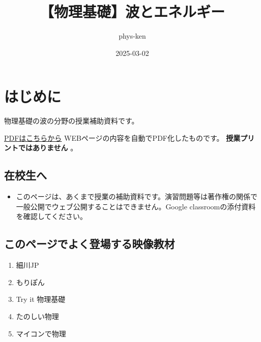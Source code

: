\documentclass[
  letterpaper,
]{bxjsbook}
\title{【物理基礎】波とエネルギー}
\author{phys-ken}
\date{2025-03-02}
\providecommand{\tightlist}{%
  \setlength{\itemsep}{0pt}\setlength{\parskip}{0pt}}\usepackage{longtable,booktabs,array}
\renewcommand*\contentsname{Table of contents}
\newcommand\contentsname{Table of contents}
\begin{document}
\maketitle

\renewcommand*\contentsname{Table of contents}
{
\hypersetup{linkcolor=}
\setcounter{tocdepth}{2}
\tableofcontents
}


\chapter*{はじめに}\label{ux306fux3058ux3081ux306b}


物理基礎の波の分野の授業補助資料です。

\href{https://phys-ken.github.io/demo_wave_2025/\%E3\%80\%90\%E7\%89\%A9\%E7\%90\%86\%E5\%9F\%BA\%E7\%A4\%8E\%E3\%80\%91\%E6\%B3\%A2\%E3\%81\%A8\%E3\%82\%A8\%E3\%83\%8D\%E3\%83\%AB\%E3\%82\%AE\%E3\%83\%BC.pdf}{PDFはこちらから}
WEBページの内容を自動でPDF化したものです。
\textbf{授業プリントではありません} 。

\section*{在校生へ}\label{ux5728ux6821ux751fux3078}


\begin{itemize}
\tightlist
\item
  このページは、あくまで授業の補助資料です。演習問題等は著作権の関係で一般公開でウェブ公開することはできません。Google
  classroomの添付資料を確認してください。
\end{itemize}

\section*{このページでよく登場する映像教材}\label{ux3053ux306eux30daux30fcux30b8ux3067ux3088ux304fux767bux5834ux3059ux308bux6620ux50cfux6559ux6750}


\begin{enumerate}
\def\labelenumi{\arabic{enumi}.}
\tightlist
\item
  細川JP
\item
  もりぽん
\item
  Try it 物理基礎
\item
  たのしい物理
\item
  マイコンで物理
\end{enumerate}
\end{document}
